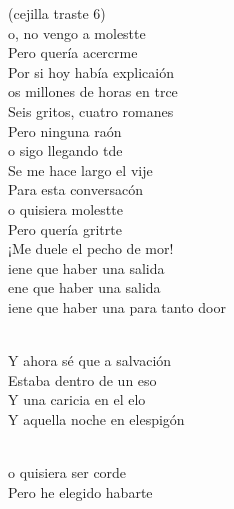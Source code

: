 \documentclass[12pt]{article}
\begin{document}
\begin{multicols*}{2}
        \begin{cancion}%
                (cejilla traste 6) \\
                o, no vengo a molestte\\
                Pero quería acercrme\\
                Por si hoy había explicaión\\
        \jump
                os millones de horas en trce\\
                Seis gritos, cuatro romanes\\
                Pero ninguna raón\\
        \jump
                o sigo llegando tde\\
                Se me hace largo el vije\\
                Para esta conversacón\\
        \jump
                o quisiera molestte\\
                Pero quería gritrte\\
                ¡Me duele el pecho de mor!\\
        \jump
                iene que haber una salida\\
                ene que haber una salida\\
                iene que haber una para tanto door\\\jump\\
                \begin{chorus}%
                Y ahora sé que a salvación\\
                Estaba dentro de un eso\\
                Y una caricia en el elo\\
                Y aquella noche en elespigón\\
                \end{chorus}%
                \jump\\
                o quisiera ser corde\\
                Pero he elegido habarte\\

\end{cancion}
\end{multicols*}
\end{document}
